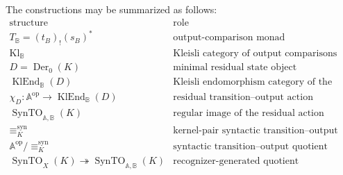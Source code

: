 The constructions may be summarized as follows:
\[
\begin{array}{c|l}
\text{structure} & \text{role} \\
\hline
T_{\mathbb B}=(t_B)_!(s_B)^*
&
\text{output-comparison monad}
\\
\operatorname{Kl}_{\mathbb B}
&
\text{Kleisli category of output comparisons}
\\
D=\operatorname{Der}_0(K)
&
\text{minimal residual state object}
\\
\operatorname{KlEnd}_{\mathbb B}(D)
&
\text{Kleisli endomorphism category of the residual family}
\\
\chi_D:\mathbb A^{\mathrm{op}}\to\operatorname{KlEnd}_{\mathbb B}(D)
&
\text{residual transition--output action}
\\
\operatorname{SynTO}_{\mathbb A,\mathbb B}(K)
&
\text{regular image of the residual action}
\\
{\equiv_K^{\mathrm{syn}}}
&
\text{kernel-pair syntactic transition--output congruence}
\\
\mathbb A^{\mathrm{op}}/{\equiv_K^{\mathrm{syn}}}
&
\text{syntactic transition--output quotient}
\\
\operatorname{SynTO}_X(K)\twoheadrightarrow
\operatorname{SynTO}_{\mathbb A,\mathbb B}(K)
&
\text{recognizer-generated quotient}
\end{array}
\]